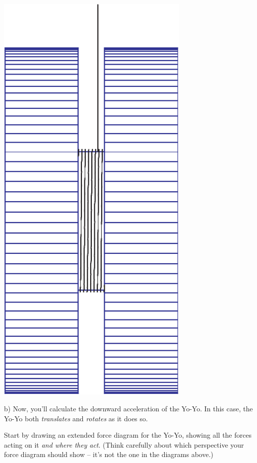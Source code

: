 \documentclass[12pt]{article}
\begin{document}
\begin{minipage}{0.20\textwidth}
		\begin{center}
		\includegraphics[width=0.7\textwidth]{blue-crop.pdf}
			\end{center}
\end{minipage}


b) Now, you'll calculate the downward acceleration of the Yo-Yo. In this case, the Yo-Yo both {\it translates} and {\it rotates} as it does so.

Start by drawing an extended force diagram for the Yo-Yo, showing all the forces acting on it {\it and where they act}. (Think carefully about which perspective your force diagram should show -- it's not the one in the diagrams above.)
\end{document}
